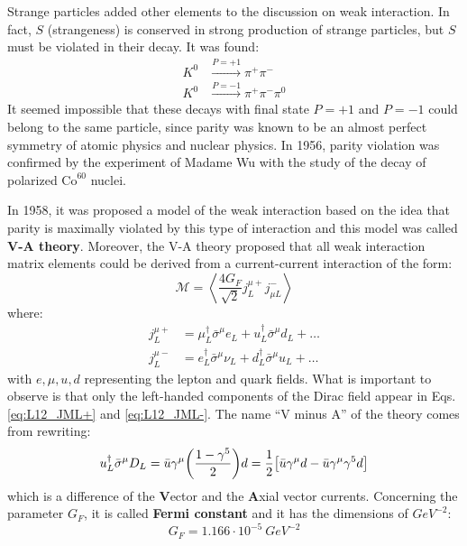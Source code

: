 \documentclass[../../main/main.tex]{subfiles}
\begin{document}
Strange particles added other elements to the discussion on weak interaction. In fact, \( S \) (strangeness) is conserved in strong production of strange particles, but \( S \) must be violated in their decay. It was found:
\begin{align}
	K^0 &\xrightarrow{P=+1} \pi^+\pi^-	\\
	K^0 &\xrightarrow{P=-1} \pi^+\pi^-\pi^0
\end{align}
It seemed impossible that these decays with final state \( P=+1 \) and \( P=-1 \) could belong to the same particle, since parity was known to be an almost perfect symmetry of atomic physics and nuclear physics. In 1956, parity violation was confirmed by the experiment of Madame Wu with the study of the decay of polarized \( \text{Co}^{60} \) nuclei.

In 1958, it was proposed a model of the weak interaction based on the idea that parity is maximally violated by this type of interaction and this model was called \textbf{V-A theory}. Moreover, the V-A theory proposed that all weak interaction matrix elements could be derived from a current-current interaction of the form:
\begin{equation}
	\mathcal{M}
	=
	\left\langle
	\frac{4G_F}{\sqrt{2}} j^{\mu+}_L j_{\mu L}^{-}
	\right\rangle
	\label{eq:L12_VATME}
\end{equation}
where:
\begin{align}
	j^{\mu+}_L	&= \mu^{\dag}_L \bar{\sigma}^{\mu} e_L + u^{\dag}_L \bar{\sigma}^{\mu} d_L + \dots \label{eq:L12_JML+} \\
	j^{\mu-}_L	&= e^{\dag}_L \bar{\sigma}^{\mu} \nu_L + d^{\dag}_L \bar{\sigma}^{\mu} u_L + \dots \label{eq:L12_JML-}
\end{align}
with \( e, \mu, u, d \) representing the lepton and quark fields. What is important to observe is that only the left-handed components of the Dirac field appear in Eqs. \ref{eq:L12_JML+} and \ref{eq:L12_JML-}. The name ``V minus A'' of the theory comes from rewriting:
\begin{equation}
	u^{\dag}_L \bar{\sigma}^{\mu} D_L
	=
	\bar{u} \gamma^{\mu} \qty(\frac{1 - \gamma^5}{2}) d
	=
	\frac{1}{2} \qty[\bar{u} \gamma^{\mu} d - \bar{u} \gamma^{\mu} \gamma^5 d]
	\label{eq:}
\end{equation}
which is a difference of the \textbf{V}ector and the \textbf{A}xial vector currents. Concerning the parameter \( G_F \), it is called \textbf{Fermi constant} and it has the dimensions of \( \si{GeV^{-2}} \):
\begin{equation}
	G_F
	=
	1.166 \cdot 10^{-5} \ \si{GeV^{-2}}
	\label{eq:}
\end{equation}
\end{document}
